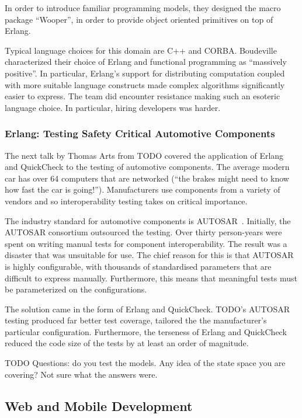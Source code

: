 \documentclass{jfp1}
\begin{document}
In order to introduce familiar programming models, they designed the macro package ``Wooper'',
in order to provide object oriented primitives on top of Erlang.

Typical language choices for this domain are C++ and CORBA. Boudeville characterized
their choice of Erlang and functional programming as ``massively positive''. In particular, Erlang's 
support for distributing computation coupled with more suitable language constructs made 
complex algorithms significantly easier to express.  The team did encounter resistance making
such an esoteric language choice. In particular, hiring developers was harder.

\subsubsection{Erlang: Testing Safety Critical Automotive Components}

The next talk by Thomas Arts from TODO covered the application of Erlang and 
QuickCheck to the testing of automotive components. The average modern car 
has over 64 computers that are networked (``the brakes might need to know how 
fast the car is going!'').  Manufacturers use components from a variety of vendors 
and so interoperability testing takes on critical importance.

The industry standard for automotive components is AUTOSAR~\cite{x}. Initially,
the AUTOSAR consortium outsourced the testing. Over thirty person-years were 
spent on writing manual tests for component interoperability. The result was a 
disaster that was unsuitable for use. The chief reason for this is that  AUTOSAR is
highly configurable, with thousands of standardised parameters that are difficult
to express manually. Furthermore, this means that meaningful tests must be
parameterized on the configurations.

The solution came in the form of Erlang and QuickCheck. TODO's AUTOSAR testing
produced far better test coverage, tailored the the manufacturer's particular
configuration. Furthermore, the terseness of Erlang and QuickCheck reduced
the code size of the tests by at least an order of magnitude.

TODO Questions: do you test the models. Any idea of the state space you are
covering? Not sure what the answers were.

\subsection{Web and Mobile Development}
\end{document}
